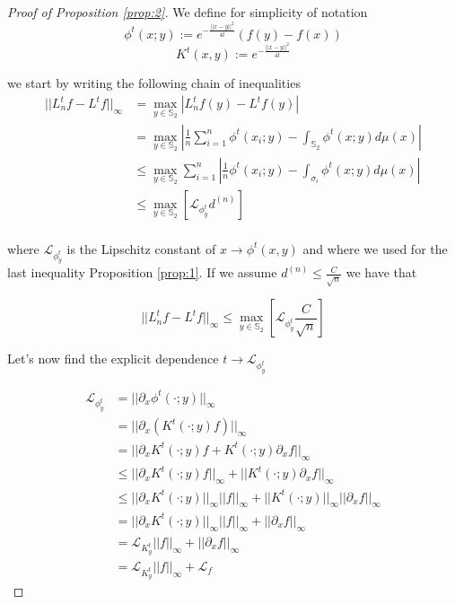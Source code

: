 \begin{proof}[Proof of Proposition \ref{prop:2}]
	
	We define for simplicity of notation
	$$\phi^t(x;y) := e^{-\frac{||x-y||^2}{4t}}\left(f(y)-f(x)\right)$$
	$$K^t(x,y) :=  e^{-\frac{||x-y||^2}{4t}}$$

	
	we start by writing the following chain of inequalities
	\begin{align*}
		||L_n^tf-L^tf||_\infty &= \max _{y\in \mathbb S_2} \left|L_n^tf(y)-L^tf(y)\right|\\
		&= \max _{y\in \mathbb S_2} \left| \frac{1}{n} \sum_{i=1}^n \phi^t(x_i; y)- \int_{\mathbb S_2} \phi^t(x;y)d\mu(x) \right|\\
		&\leq \max _{y\in \mathbb S_2}  \sum_{i=1}^n   \left| \frac{1}{n}  \phi^t(x_i; y)- \int_{\sigma_i} \phi^t(x;y)d\mu(x) \right|\\
		&\leq  \max _{y\in \mathbb S_2} \left[\mathcal L_{\phi^t_y}d^{(n)} \right]\\
	\end{align*}
	
	
	where $\mathcal L_{\phi^t_y}$ is the Lipschitz constant of $x \rightarrow \phi^t(x, y)$ and where we used for the last inequality Proposition \ref{prop:1}. If we assume $d^{(n)}\leq \frac{C}{\sqrt{n}}$ we have that
	
	$$||L_n^tf-L^tf||_\infty  \leq  \max _{y\in \mathbb S_2} \left[ \mathcal L_{\phi^t_y} \frac{C}{\sqrt{n}} \right]$$
	
	Let's now find the explicit dependence $t\rightarrow \mathcal L_{\phi^t_y}$
	
	\begin{align*}
		\mathcal L_{\phi^t_y} &= ||\partial_x\phi^t(\cdot;y)||_\infty\\&
		= ||\partial_x\left(K^t(\cdot;y)f\right)||_\infty\\&
		= ||\partial_x K^t(\cdot;y)f + K^t(\cdot;y)\partial_x f||_\infty\\&
		\leq ||\partial_x K^t(\cdot;y)f||_\infty + ||K^t(\cdot;y)\partial_x f||_\infty\\&
		\leq  ||\partial_x K^t(\cdot;y)||_\infty||f||_\infty + ||K^t(\cdot;y)||_\infty||\partial_x f||_\infty\\&
		= ||\partial_x K^t(\cdot;y)||_\infty||f||_\infty + ||\partial_x f||_\infty\\&
		= \mathcal L_{K^t_y} ||f||_\infty + ||\partial_xf||_\infty\\&
		= \mathcal L_{K^t_y} ||f||_\infty + \mathcal L_f
	\end{align*}
	

\end{proof}
